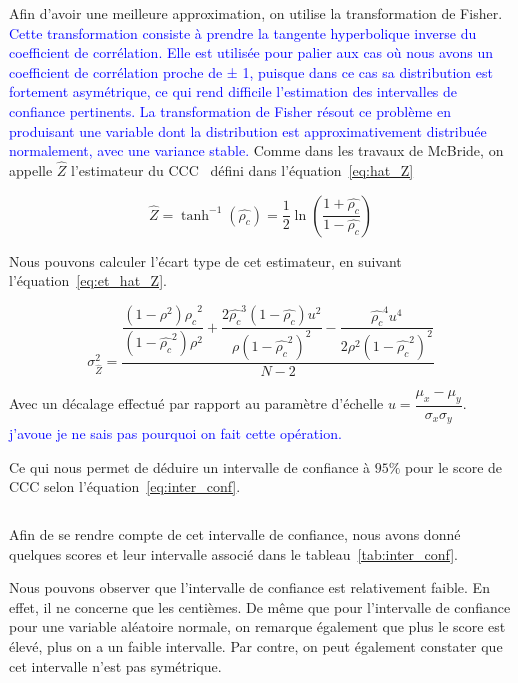 Afin d'avoir une meilleure approximation, on utilise la transformation de Fisher.
\textcolor{blue}{Cette transformation consiste à prendre la tangente hyperbolique inverse du coefficient de corrélation. Elle est utilisée pour palier aux cas où nous avons un coefficient de corrélation proche de ± 1, puisque dans ce cas sa distribution est fortement asymétrique, ce qui rend difficile l'estimation des intervalles de confiance pertinents. La transformation de Fisher résout ce problème en produisant une variable dont la distribution est approximativement distribuée normalement, avec une variance stable.} Comme dans les travaux de McBride, on appelle $\hat{Z}$ l'estimateur du CCC~\cite{McBride2005} défini dans l'équation~\ref{eq:hat_Z}

\begin{equation}
  \hat{Z} = \tanh^{-1}(\hat{\rho_c}) =  \dfrac{1}{2} \ln \left( \dfrac{1+ \hat{\rho_c} }{1 -\hat{\rho_c}}  \right)
  \label{eq:hat_Z}
\end{equation}

Nous pouvons calculer l'écart type de cet estimateur, en suivant l'équation~\ref{eq:et_hat_Z}.

\begin{equation}
\sigma_{\hat{Z} }^2 = \dfrac{\dfrac{(1-\rho^2) \hat{\rho_c} ^2}{(1-\hat{\rho_c}^2)\rho^2 } +  \dfrac{2\hat{\rho_c} ^3(1-\hat{\rho_c} )u^2}{\rho(1-\hat{\rho_c} ^2)^2} - \dfrac{\hat{\rho_c}^4 u^4}{2 \rho^2 (1-\hat{\rho_c}^2 )^2}}{N-2}
\label{eq:et_hat_Z}
\end{equation}

Avec un décalage effectué par rapport au paramètre d'échelle $u = \dfrac{\mu_x - \mu_y}{\sigma_x \sigma_y}$. \textcolor{blue}{j'avoue je ne sais pas pourquoi on fait cette opération.}

Ce qui nous permet de déduire un intervalle de confiance à $95\%$ pour le score de CCC selon l'équation~\ref{eq:inter_conf}.

\begin{equation}
    [\tanh (\hat{Z} - 1.64 \sigma_{\hat{Z}}); \tanh(\hat{Z} + 1.64 \sigma_{\hat{Z}})]
    \label{eq:inter_conf}
\end{equation}

Afin de se rendre compte de cet intervalle de confiance, nous avons donné quelques scores et leur intervalle associé dans le tableau~\ref{tab:inter_conf}.



Nous pouvons observer que l'intervalle de confiance est relativement faible. En effet, il ne concerne que les centièmes. De même que pour l'intervalle de confiance pour une variable aléatoire normale, on remarque également que plus le score est élevé, plus on a un faible intervalle. Par contre, on peut également constater que cet intervalle n'est pas symétrique.


